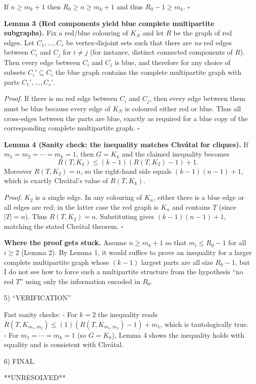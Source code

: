 If $n\ge m_k+1$ then $R_0\ge n\ge m_k+1$ and thus $R_0-1\ge m_k$. $\square$

\textbf{Lemma 3 (Red components yield blue complete multipartite subgraphs).}
Fix a red/blue colouring of $K_N$ and let $R$ be the graph of red edges. Let $C_1,\dots,C_s$ be vertex-disjoint sets such that there are \emph{no} red edges between $C_i$ and $C_j$ for $i\neq j$ (for instance, distinct connected components of $R$).
Then every edge between $C_i$ and $C_j$ is blue, and therefore for any choice of subsets $C_i'\subseteq C_i$ the blue graph contains the complete multipartite graph with parts $C_1',\dots,C_s'$.

\emph{Proof.}
If there is no red edge between $C_i$ and $C_j$, then every edge between them must be blue because every edge of $K_N$ is coloured either red or blue. Thus all cross-edges between the parts are blue, exactly as required for a blue copy of the corresponding complete multipartite graph. $\square$

\textbf{Lemma 4 (Sanity check: the inequality matches Chv\'atal for cliques).}
If $m_1=m_2=\cdots=m_k=1$, then $G=K_k$ and the claimed inequality becomes
\[
R(T,K_k)\le (k-1)(R(T,K_2)-1)+1.
\]
Moreover $R(T,K_2)=n$, so the right-hand side equals $(k-1)(n-1)+1$, which is exactly Chv\'atal's value of $R(T,K_k)$.

\emph{Proof.}
$K_2$ is a single edge. In any colouring of $K_n$, either there is a blue edge or all edges are red; in the latter case the red graph is $K_n$ and contains $T$ (since $|T|=n$). Thus $R(T,K_2)=n$.
Substituting gives $(k-1)(n-1)+1$, matching the stated Chv\'atal theorem. $\square$

\textbf{Where the proof gets stuck.}
Assume $n\ge m_k+1$ so that $m_i\le R_0-1$ for all $i\ge 2$ (Lemma 2). By Lemma 1, it would suffice to prove an inequality for a larger complete multipartite graph whose $(k-1)$ largest parts are all size $R_0-1$, but I do not see how to force such a multipartite structure from the hypothesis “no red $T$” using only the information encoded in $R_0$.

5) “VERIFICATION”

Fast sanity checks:
- For $k=2$ the inequality reads $R(T,K_{m_1,m_2})\le (1)(R(T,K_{m_1,m_2})-1)+m_1$, which is tautologically true.
- For $m_1=\cdots=m_k=1$ (so $G=K_k$), Lemma 4 shows the inequality holds with equality and is consistent with Chv\'atal.

6) FINAL

**UNRESOLVED**

